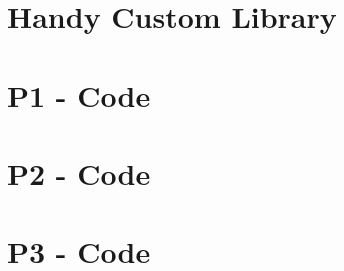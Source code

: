 \documentclass{tron}
\begin{document}


\newpage
\appendix
\begin{appendices}
\section{Handy Custom Library}


\section{P1 - Code}


\section{P2 - Code}



\section{P3 - Code}




\end{appendices}
\end{document}
